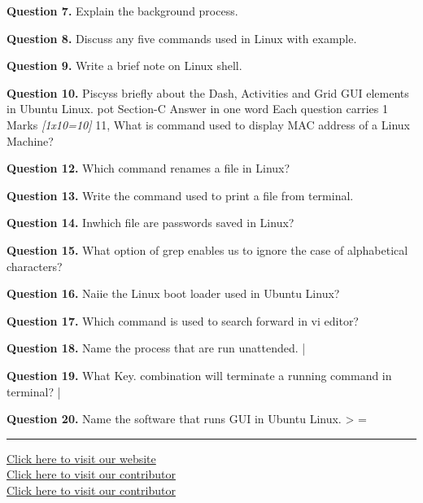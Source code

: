 \documentclass[11pt,a4paper]{article}
\newcommand{\pts}[1]{\hfill\textit{[#1]}}
\begin{document}
\medskip\noindent\textbf{Question 7.} Explain the background process.

\medskip\noindent\textbf{Question 8.} Discuss any five commands used in Linux with example.

\medskip\noindent\textbf{Question 9.} Write a brief note on Linux shell.

\medskip\noindent\textbf{Question 10.} Piscyss briefly about the Dash, Activities and Grid GUI elements in Ubuntu Linux.
pot Section-C
Answer in one word
Each question carries 1 Marks
\pts{1x10=10}
11, What is command used to display MAC address of a Linux Machine?

\medskip\noindent\textbf{Question 12.} Which command renames a file in Linux?

\medskip\noindent\textbf{Question 13.} Write the command used to print a file from terminal.

\medskip\noindent\textbf{Question 14.} Inwhich file are passwords saved in Linux?

\medskip\noindent\textbf{Question 15.} What option of grep enables us to ignore the case of alphabetical characters?

\medskip\noindent\textbf{Question 16.} Naiie the Linux boot loader used in Ubuntu Linux?

\medskip\noindent\textbf{Question 17.} Which command is used to search forward in vi editor?

\medskip\noindent\textbf{Question 18.} Name the process that are run unattended. |

\medskip\noindent\textbf{Question 19.} What Key. combination will terminate a running command in terminal? |

\medskip\noindent\textbf{Question 20.} Name the software that runs GUI in Ubuntu Linux.
> =

\vfill
\rule{\linewidth}{0.4pt}
\begin{center}\small
\href{https://bhu-exam.vercel.app/}{Click here to visit our website}\\[4pt]\href{https://me-aryan.vercel.app/}{Click here to visit our contributor}\\[4pt]\href{https://quashan-me.vercel.app/}{Click here to visit our contributor}
\end{center}
\end{document}
